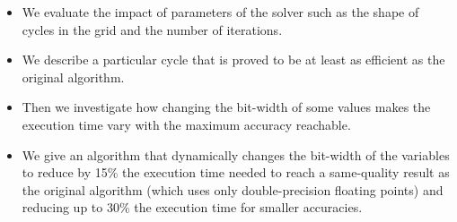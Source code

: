 \begin{itemize}
\item We evaluate the impact of parameters of the solver such as the shape of cycles in the grid and the
number of iterations. 
\item We describe a particular cycle that is proved to be at least as efficient as the original algorithm. 
\item Then we investigate how changing the bit-width of some values makes the execution time vary with the maximum accuracy reachable.
\item We give an algorithm that dynamically changes the bit-width of the variables to reduce by 15\% the execution
time needed to reach a same-quality result as the original algorithm (which uses only double-precision floating points) and reducing up to 30\% the execution time for smaller accuracies.
\end{itemize}